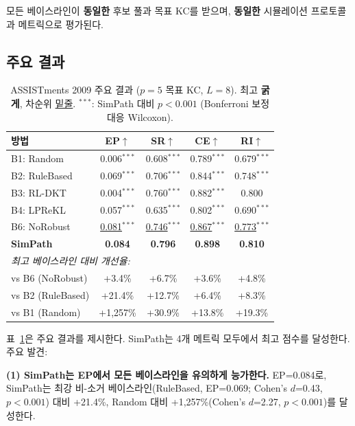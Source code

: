 \documentclass[runningheads]{llncs}
\begin{document}
모든 베이스라인이 \textbf{동일한} 후보 풀과 목표 KC를 받으며, \textbf{동일한} 시뮬레이션 프로토콜과 메트릭으로 평가된다.

\subsection{주요 결과}

\begin{table}[t]
\centering
\caption{ASSISTments 2009 주요 결과 ($p=5$ 목표 KC, $L=8$). 최고 \textbf{굵게}, 차순위 \underline{밑줄}. $^{***}$: SimPath 대비 $p<0.001$ (Bonferroni 보정 대응 Wilcoxon).}
\label{tab:main}
\begin{tabular}{lcccc}
\toprule
\textbf{방법} & \textbf{EP}$\uparrow$ & \textbf{SR}$\uparrow$ & \textbf{CE}$\uparrow$ & \textbf{RI}$\uparrow$ \\
\midrule
B1: Random         & 0.006$^{***}$ & 0.608$^{***}$ & 0.789$^{***}$ & 0.679$^{***}$ \\
B2: RuleBased      & 0.069$^{***}$ & 0.706$^{***}$ & 0.844$^{***}$ & 0.748$^{***}$ \\
B3: RL-DKT         & 0.004$^{***}$ & 0.760$^{***}$ & 0.882$^{***}$ & 0.800 \\
B4: LPReKL         & 0.057$^{***}$ & 0.635$^{***}$ & 0.802$^{***}$ & 0.690$^{***}$ \\
B6: NoRobust       & \underline{0.081}$^{***}$ & \underline{0.746}$^{***}$ & \underline{0.867}$^{***}$ & \underline{0.773}$^{***}$ \\
\midrule
\textbf{SimPath}   & \textbf{0.084} & \textbf{0.796} & \textbf{0.898} & \textbf{0.810} \\
\midrule
\multicolumn{5}{l}{\textit{최고 베이스라인 대비 개선율:}} \\
vs B6 (NoRobust)   & +3.4\% & +6.7\% & +3.6\% & +4.8\% \\
vs B2 (RuleBased)  & +21.4\% & +12.7\% & +6.4\% & +8.3\% \\
vs B1 (Random)     & +1,257\% & +30.9\% & +13.8\% & +19.3\% \\
\bottomrule
\end{tabular}
\end{table}

표~\ref{tab:main}은 주요 결과를 제시한다.
SimPath는 4개 메트릭 모두에서 최고 점수를 달성한다.
주요 발견:

\textbf{(1) SimPath는 EP에서 모든 베이스라인을 유의하게 능가한다.}
EP=0.084로, SimPath는 최강 비-소거 베이스라인(RuleBased, EP=0.069; Cohen's $d$=0.43, $p<0.001$) 대비 +21.4\%, Random 대비 +1,257\%(Cohen's $d$=2.27, $p<0.001$)를 달성한다.
\end{document}

